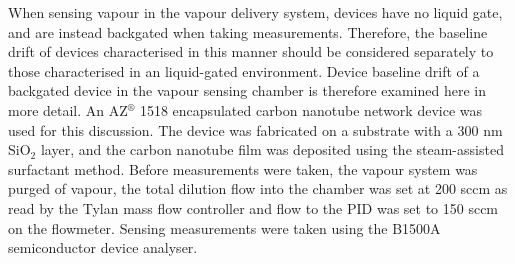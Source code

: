 \documentclass[
  a4paper,
]{scrbook}
\begin{document}
When sensing vapour in the vapour delivery system, devices have no
liquid gate, and are instead backgated when taking measurements.
Therefore, the baseline drift of devices characterised in this manner
should be considered separately to those characterised in an
liquid-gated environment. Device baseline drift of a backgated device in
the vapour sensing chamber is therefore examined here in more detail. An
AZ\(^\circledR\) 1518 encapsulated carbon nanotube network device was
used for this discussion. The device was fabricated on a substrate with
a 300 nm SiO\(_2\) layer, and the carbon nanotube film was deposited
using the steam-assisted surfactant method. Before measurements were
taken, the vapour system was purged of vapour, the total dilution flow
into the chamber was set at 200 sccm as read by the Tylan mass flow
controller and flow to the PID was set to 150 sccm on the flowmeter.
Sensing measurements were taken using the B1500A semiconductor device
analyser.
\end{document}
